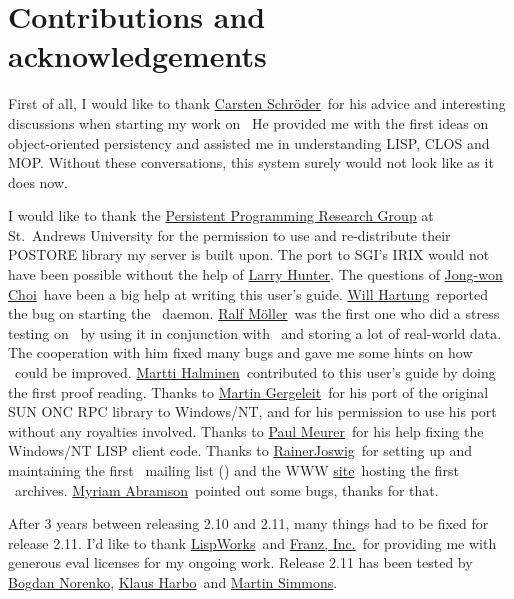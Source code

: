 \chapter{Contributions and acknowledgements}


First of all, I would like to thank
\href{mailto:schroeder@acm.org}{Carsten Schr\"{o}der}\ for his advice
and interesting discussions when starting my work on \plob\ He
provided me with the first ideas on object-oriented persistency and
assisted me in understanding LISP, CLOS and MOP.  Without these
conversations, this system surely would not look like as it does now.

I would like to thank the
\href{http://www-ppg.dcs.st-and.ac.uk}{Persistent
  Programming Research Group} at St.\ Andrews University for the
permission to use and re-distribute their POSTORE library my server is
built upon.  The port to SGI's IRIX would not have been possible
without the help of \href{mailto:hunter@work.nlm.nih.gov}{Larry
  Hunter}.  The questions of
\href{mailto:jwchoi@lgsemicon.co.kr}{Jong-won Choi}\ have been a big
help at writing this user's guide.
\href{mailto:vfr750@netcom.com}{Will Hartung}\ reported the bug on
starting the \ daemon.
\href{mailto:moeller@informatik.uni-hamburg.de}{Ralf M\"{o}ller}\ was
the first one who did a stress testing on \plob\ by using it in
conjunction with \ and storing a lot of real-world data.
The cooperation with him fixed many bugs and gave me some hints on how
\plob\ could be improved.  \href{mailto:mha@dpe.fi}{Martti Halminen}\ 
contributed to this user's guide by doing the first proof reading.
Thanks to \href{mailto:gergeleit@gmd.de}{Martin Gergeleit}\ for his
port of the original SUN ONC RPC library to Windows/NT, and for his
permission to use his port without any royalties involved. Thanks to
\href{mailto:paul.meurer@hit.uib.no}{Paul Meurer}\ for his help fixing
the Windows/NT LISP client code.  Thanks to
\href{mailto:joswig@lispmachine.de}{RainerJoswig}\ for setting up and
maintaining the first \plob\ mailing list (\lisp{plob@lisp.de})
and the WWW \href{http://www.lisp.de}{site}\ hosting the first \plob\ 
archives. \href{mabramso@nlm.nih.gov}{Myriam Abramson}\ pointed out
some bugs, thanks for that.

After 3 years between releasing 2.10 and 2.11, many things had to be
fixed for release 2.11. I'd like to thank
\href{http://www.lispworks.com}{LispWorks}\ and
\href{http://www.franz.com}{Franz, Inc.}\ for providing me with
generous eval licenses for my ongoing work. Release 2.11 has been tested by
\href{mailto:xset@mail.ru}{Bogdan Norenko}, 
\href{mailto:klaus@harbo.net}{Klaus Harbo}\ and
\href{mailto:martin@lispworks.com}{Martin Simmons}.

